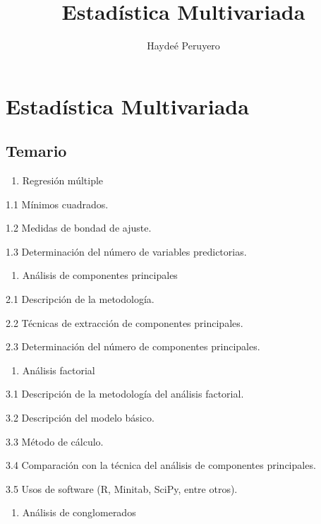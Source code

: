 \documentclass[
]{book}
\title{Estadística Multivariada}
\author{Haydeé Peruyero}
\date{}
\providecommand{\tightlist}{%
  \setlength{\itemsep}{0pt}\setlength{\parskip}{0pt}}
\begin{document}
\maketitle

{
\setcounter{tocdepth}{1}
\tableofcontents
}
\chapter{Estadística Multivariada}\label{estaduxedstica-multivariada}

\section{Temario}\label{temario}

\begin{enumerate}
\def\labelenumi{\arabic{enumi}.}
\tightlist
\item
  Regresión múltiple
\end{enumerate}

1.1 Mínimos cuadrados.

1.2 Medidas de bondad de ajuste.

1.3 Determinación del número de variables predictorias.

\begin{enumerate}
\def\labelenumi{\arabic{enumi}.}
\setcounter{enumi}{1}
\tightlist
\item
  Análisis de componentes principales
\end{enumerate}

2.1 Descripción de la metodología.

2.2 Técnicas de extracción de componentes principales.

2.3 Determinación del número de componentes principales.

\begin{enumerate}
\def\labelenumi{\arabic{enumi}.}
\setcounter{enumi}{2}
\tightlist
\item
  Análisis factorial
\end{enumerate}

3.1 Descripción de la metodología del análisis factorial.

3.2 Descripción del modelo básico.

3.3 Método de cálculo.

3.4 Comparación con la técnica del análisis de componentes principales.

3.5 Usos de software (R, Minitab, SciPy, entre otros).

\begin{enumerate}
\def\labelenumi{\arabic{enumi}.}
\setcounter{enumi}{3}
\tightlist
\item
  Análisis de conglomerados
\end{enumerate}
\end{document}
